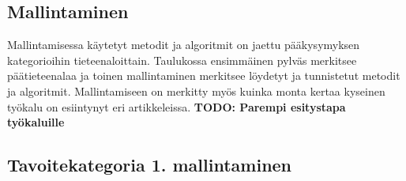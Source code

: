 \documentclass[utf8]{gradu3}
\begin{document}
\subsection{Mallintaminen}
Mallintamisessa käytetyt metodit ja algoritmit on jaettu pääkysymyksen
kategorioihin tieteenaloittain. Taulukossa ensimmäinen pylväs merkitsee
päätieteenalaa  ja toinen mallintaminen merkitsee löydetyt ja tunnistetut 
metodit ja algoritmit. Mallintamiseen on merkitty myös 
kuinka monta kertaa kyseinen työkalu on esiintynyt eri artikkeleissa.
\textbf{TODO: Parempi esitystapa työkaluille}

\subsection{Tavoitekategoria 1. mallintaminen}
\end{document}
